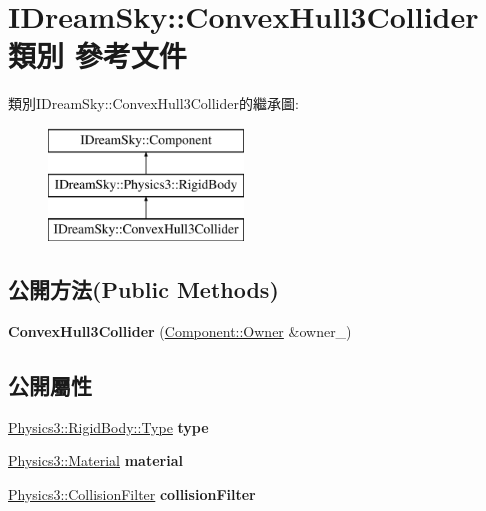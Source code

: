 \hypertarget{class_i_dream_sky_1_1_convex_hull3_collider}{}\section{I\+Dream\+Sky\+:\+:Convex\+Hull3\+Collider 類別 參考文件}
\label{class_i_dream_sky_1_1_convex_hull3_collider}
類別\+I\+Dream\+Sky\+:\+:Convex\+Hull3\+Collider的繼承圖\+:\begin{figure}[H]
\begin{center}
\leavevmode
\includegraphics[height=3.000000cm]{class_i_dream_sky_1_1_convex_hull3_collider}
\end{center}
\end{figure}
\subsection*{公開方法(Public Methods)}
\begin{DoxyCompactItemize}
\item 
{\bfseries Convex\+Hull3\+Collider} (\hyperlink{class_i_dream_sky_1_1_component_1_1_owner}{Component\+::\+Owner} \&owner\+\_\+)\hypertarget{class_i_dream_sky_1_1_convex_hull3_collider_abf85df7f61c3ad59fb65e7bc5eca0447}{}\label{class_i_dream_sky_1_1_convex_hull3_collider_abf85df7f61c3ad59fb65e7bc5eca0447}

\end{DoxyCompactItemize}
\subsection*{公開屬性}
\begin{DoxyCompactItemize}
\item 
\hyperlink{class_i_dream_sky_1_1_physics3_1_1_rigid_body_a8a970d66442558ce0a3ce7b8009c14fa}{Physics3\+::\+Rigid\+Body\+::\+Type} {\bfseries type}\hypertarget{class_i_dream_sky_1_1_convex_hull3_collider_a19bae4df53504e140435b9266d9dbc13}{}\label{class_i_dream_sky_1_1_convex_hull3_collider_a19bae4df53504e140435b9266d9dbc13}

\item 
\hyperlink{class_i_dream_sky_1_1_physics3_1_1_material}{Physics3\+::\+Material} {\bfseries material}\hypertarget{class_i_dream_sky_1_1_convex_hull3_collider_a49dfffaf7f507a9aadfa5bbaeacdf1c6}{}\label{class_i_dream_sky_1_1_convex_hull3_collider_a49dfffaf7f507a9aadfa5bbaeacdf1c6}

\item 
\hyperlink{class_i_dream_sky_1_1_physics3_1_1_collision_filter}{Physics3\+::\+Collision\+Filter} {\bfseries collision\+Filter}\hypertarget{class_i_dream_sky_1_1_convex_hull3_collider_a418ff073068b5c0f9fd59c1708b29094}{}\label{class_i_dream_sky_1_1_convex_hull3_collider_a418ff073068b5c0f9fd59c1708b29094}

\end{DoxyCompactItemize}
